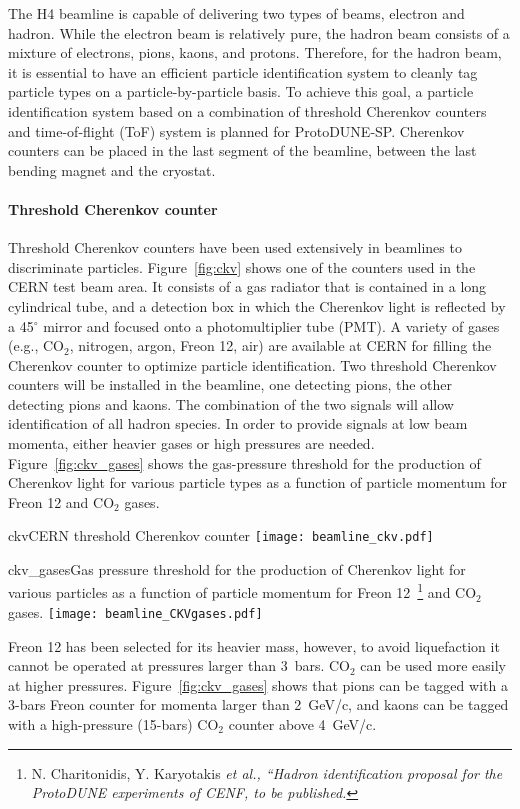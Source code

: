 The H4 beamline is capable of delivering two types of beams, electron and hadron. %
While the electron beam is relatively pure, the hadron beam consists of a mixture of electrons, pions, kaons, and protons. Therefore, for the hadron beam, it is essential to have an efficient particle identification system to cleanly tag particle types on a particle-by-particle basis. To achieve this goal, a particle identification system based on a combination of threshold Cherenkov counters and time-of-flight (ToF) system is planned for ProtoDUNE-SP. 
Cherenkov counters can be placed in the last segment of the beamline, between the last bending magnet and the cryostat. 

\paragraph{Threshold Cherenkov counter}
Threshold Cherenkov counters have been used extensively in beamlines to discriminate particles. Figure~\ref{fig:ckv} shows one of the counters used in the CERN test beam area. It consists of a gas radiator that is contained in a long cylindrical tube, and a detection box in which the Cherenkov light is reflected by a 45$^\circ$ mirror and focused onto a photomultiplier tube (PMT). 
A variety of gases (e.g., CO$_2$, nitrogen, argon, Freon 12, air) are available at CERN for filling the Cherenkov counter to optimize particle identification. 
Two threshold Cherenkov counters will be installed in the beamline, one detecting pions, the other detecting pions 
and kaons. The combination of the two signals will allow identification of all hadron species. In order to provide signals at low beam momenta, either heavier gases or high pressures are needed.
Figure~\ref{fig:ckv_gases} shows the gas-pressure threshold 
for the production of Cherenkov light for various particle types as a function of particle momentum for Freon 12 and CO$_2$ gases.
\begin{cdrfigure}{ckv}{CERN threshold Cherenkov counter}
  \texttt{[image: beamline\_ckv.pdf]}
\end{cdrfigure}
\begin{cdrfigure}{ckv_gases}{Gas pressure threshold for the production of Cherenkov light for various particles as a function of particle momentum for Freon 12~\footnote{N. Charitonidis, Y. Karyotakis \it{et al.}, ``Hadron identification proposal for the ProtoDUNE experiments of CENF, to be published.} and CO$_2$ gases.}
  \texttt{[image: beamline\_CKVgases.pdf]}
\end{cdrfigure}
Freon 12 has been selected for its heavier mass, however,  to avoid liquefaction it cannot be operated at pressures larger than 3~bars.  CO$_2$ can be used more easily at higher pressures.  
 Figure~\ref{fig:ckv_gases} shows that pions can be tagged with a 3-bars Freon counter for momenta larger than 2~GeV/c, and kaons can be tagged with a high-pressure  (15-bars) CO$_2$  counter above 4~GeV/c.

